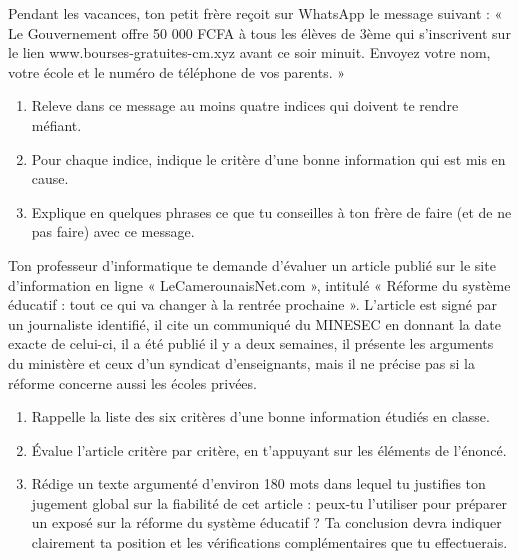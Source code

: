\documentclass[11pt]{article}
\newcounter{popsec}
\newcounter{popsub}
\newcommand{\courssub}[1]{%
  \stepcounter{popsub}%
  \par\vspace{9pt}\noindent{\popxbold\fontsize{11.5}{13}\selectfont\color{popink}{\color{poporange}\thepopsec.\thepopsub}\hspace{6pt}#1}\par\nopagebreak\vspace{4pt}
}
\begin{document}
\begin{exercice}
Pendant les vacances, ton petit frère reçoit sur WhatsApp le message suivant : « Le Gouvernement offre 50 000 FCFA à tous les élèves de 3ème qui s'inscrivent sur le lien www.bourses-gratuites-cm.xyz avant ce soir minuit. Envoyez votre nom, votre école et le numéro de téléphone de vos parents. »
\begin{enumerate}
\item Releve dans ce message au moins quatre indices qui doivent te rendre méfiant.
\item Pour chaque indice, indique le critère d'une bonne information qui est mis en cause.
\item Explique en quelques phrases ce que tu conseilles à ton frère de faire (et de ne pas faire) avec ce message.
\end{enumerate}
\end{exercice}

\courssub{Je me prépare au BEPC}

\begin{exercice}
Ton professeur d'informatique te demande d'évaluer un article publié sur le site d'information en ligne « LeCamerounaisNet.com », intitulé « Réforme du système éducatif : tout ce qui va changer à la rentrée prochaine ». L'article est signé par un journaliste identifié, il cite un communiqué du MINESEC en donnant la date exacte de celui-ci, il a été publié il y a deux semaines, il présente les arguments du ministère et ceux d'un syndicat d'enseignants, mais il ne précise pas si la réforme concerne aussi les écoles privées.

\begin{enumerate}
\item Rappelle la liste des six critères d'une bonne information étudiés en classe.
\item Évalue l'article critère par critère, en t'appuyant sur les éléments de l'énoncé.
\item Rédige un texte argumenté d'environ 180 mots dans lequel tu justifies ton jugement global sur la fiabilité de cet article : peux-tu l'utiliser pour préparer un exposé sur la réforme du système éducatif ? Ta conclusion devra indiquer clairement ta position et les vérifications complémentaires que tu effectuerais.
\end{enumerate}
\end{exercice}
\end{document}
